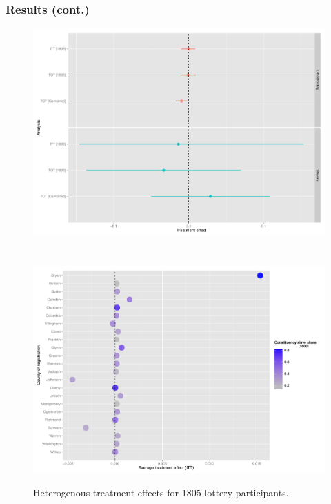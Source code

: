\documentclass{beamer}
\begin{document}
\begin{frame}
\frametitle{Results (cont.)}
\begin{figure}[htbp]
\begin{center}
   \includegraphics[scale=0.37]{forest-plot.pdf} 
   \label{forest-plot} \\
   \end{center}
\end{figure}
\end{frame}

\section[Heterogeneous treatment effects]{}

\begin{frame}
\begin{figure}[htbp]
\begin{center}
      \caption{Heterogenous treatment effects for 1805 lottery participants.}
   \includegraphics[scale=0.35]{het-plot-oh.pdf} 
   \label{het-plot-oh}
   \end{center}
\end{figure}
\end{frame}
\end{document}
